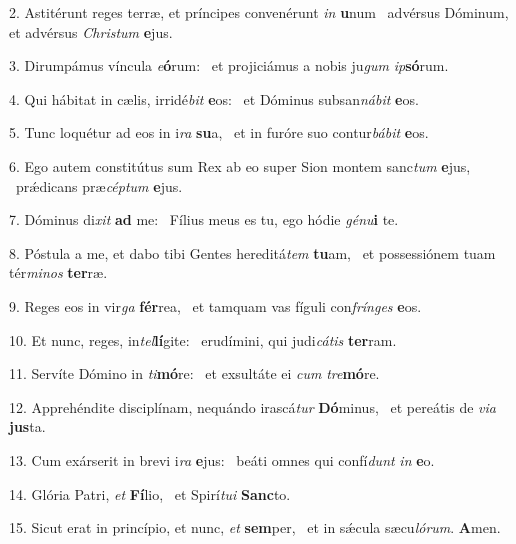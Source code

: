 2. Astitérunt reges terræ, et príncipes convenérunt \textit{in} \textbf{u}num \ast\  advérsus Dóminum, et advérsus \textit{Chris}\textit{tum} \textbf{e}jus.\

3. Dirumpámus víncula \textit{e}\textbf{ó}rum: \ast\  et projiciámus a nobis ju\textit{gum} \textit{ip}\textbf{só}rum.\

4. Qui hábitat in cælis, irridé\textit{bit} \textbf{e}os: \ast\  et Dóminus subsan\textit{ná}\textit{bit} \textbf{e}os.\

5. Tunc loquétur ad eos in i\textit{ra} \textbf{su}a, \ast\  et in furóre suo contur\textit{bá}\textit{bit} \textbf{e}os.\

6. Ego autem constitútus sum Rex ab eo super Sion montem sanc\textit{tum} \textbf{e}jus, \ast\  prǽdicans præ\textit{cép}\textit{tum} \textbf{e}jus.\

7. Dóminus di\textit{xit} \textbf{ad} me: \ast\  Fílius meus es tu, ego hódie \textit{gé}\textit{nu}\textbf{i} te.\

8. Póstula a me, et dabo tibi Gentes hereditá\textit{tem} \textbf{tu}am, \ast\  et possessiónem tuam tér\textit{mi}\textit{nos} \textbf{ter}ræ.\

9. Reges eos in vir\textit{ga} \textbf{fér}rea, \ast\  et tamquam vas fíguli con\textit{frín}\textit{ges} \textbf{e}os.\

10. Et nunc, reges, in\textit{tel}\textbf{lí}gite: \ast\  erudímini, qui judi\textit{cá}\textit{tis} \textbf{ter}ram.\

11. Servíte Dómino in \textit{ti}\textbf{mó}re: \ast\  et exsultáte ei \textit{cum} \textit{tre}\textbf{mó}re.\

12. Apprehéndite disciplínam, nequándo irascá\textit{tur} \textbf{Dó}minus, \ast\  et pereátis de \textit{vi}\textit{a} \textbf{jus}ta.\

13. Cum exárserit in brevi i\textit{ra} \textbf{e}jus: \ast\  beáti omnes qui confí\textit{dunt} \textit{in} \textbf{e}o.\

14. Glória Patri, \textit{et} \textbf{Fí}lio, \ast\  et Spirí\textit{tu}\textit{i} \textbf{Sanc}to.\

15. Sicut erat in princípio, et nunc, \textit{et} \textbf{sem}per, \ast\  et in sǽcula sæcu\textit{ló}\textit{rum}. \textbf{A}men.\

